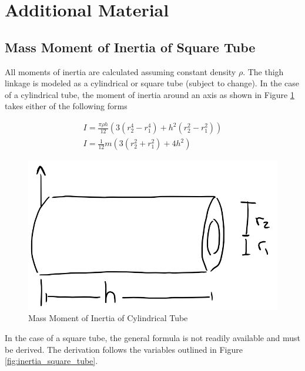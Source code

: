 \section{Additional Material} \label{app:additional_material}

\subsection{Mass Moment of Inertia of Square Tube} \label{app:mass_moment_of_inertia}

All moments of inertia are calculated assuming constant density $\rho$.
The thigh linkage is modeled as a cylindrical or square tube (subject to change).
In the case of a cylindrical tube, the moment of inertia around an axis as shown in Figure \ref{fig:inertia_cylinder} takes either of the following forms \cite{wikipedia_list_2019}

\begin{gather}
    I = \frac{\pi\rho h}{12} (3 (r_2^4 - r_1^4) + h^2 (r_2^2 - r_1^2))
    \\
    I = \frac{1}{12} m (3 (r_2^2 + r_1^2) + 4h^2)
\end{gather}

\begin{figure} [H]
    \centering
    \includegraphics{4_ComponentProperties/img/inertia_cylinder.png}
    \caption{Mass Moment of Inertia of Cylindrical Tube}
    \label{fig:inertia_cylinder}
\end{figure}

In the case of a square tube, the general formula is not readily available  and must be derived.
The derivation follows the variables outlined in Figure \ref{fig:inertia_square_tube}.

